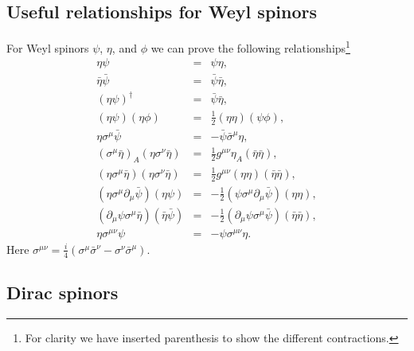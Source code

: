 \documentclass[notes.tex]{subfiles}
\begin{document}
\subsection{Useful relationships for Weyl spinors}
\label{sec:Weylspinor_calc}
For Weyl spinors $\psi$, $\eta$, and $\phi$ we can prove the following relationships\footnote{For clarity we have inserted parenthesis to show the different contractions.} 
\begin{eqnarray}
\eta\psi 				&=& \psi\eta,  \label{eq:Weylspinor_etapsi}  \\
\bar\eta\bar\psi 			&=& \bar\psi\bar\eta,  \\
(\eta\psi)^\dagger 		&=& \bar\psi\bar\eta,  \\
(\eta\psi)(\eta\phi) 		&=& \frac{1}{2}(\eta\eta)(\psi\phi), \label{eq:Weylspinor_etapsietapsi}  \\
\eta\sigma^\mu\bar\psi 	&=& - \bar\psi\bar\sigma^\mu\eta,  \label{eq:Weylspinor_etasigmapsi} \\
(\sigma^\mu \bar{\eta})_A(\eta\sigma^\nu \bar{\eta})&=&\frac{1}{2}g^{\mu\nu}\eta_A(\bar{\eta}\bar{\eta}), \label{eq:Weylspinor_sigmaetaetasigmaeta}\\
(\eta\sigma^\mu \bar{\eta})(\eta\sigma^\nu \bar{\eta})&=&\frac{1}{2}g^{\mu\nu}(\eta\eta)(\bar{\eta}\bar{\eta}),   \label{eq:Weylspinor_etasigmamuetaetasigmanueta} \\
(\eta\sigma^\mu\partial_\mu \bar\psi )(\eta\psi) &=& -\frac{1}{2}(\psi\sigma^\mu\partial_\mu \bar\psi)(\eta\eta),\\
(\partial_\mu\psi\sigma^\mu \bar\eta)(\bar\eta\bar\psi) &=& -\frac{1}{2}(\partial_\mu\psi\sigma^\mu \bar\psi)(\bar\eta\bar\eta), \label{eq:Weylspinor_last} \\
\eta\sigma^{\mu\nu}\psi	&=&-\psi\sigma^{\mu\nu}\eta.   \label{eq:Weylspinor_etasigmamunupsi} 
\end{eqnarray}
Here $\sigma^{\mu\nu} = \frac{i}{4}(\sigma^\mu \bar{\sigma}^\nu - \sigma^\nu \bar{\sigma}^\mu)$.



\subsection{Dirac spinors}
\label{sec:gammamatrices}
\end{document}
